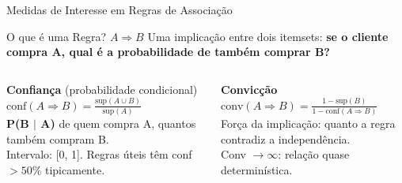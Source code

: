\documentclass[aspectratio=169]{beamer}
\begin{document}
\begin{frame}{Medidas de Interesse em Regras de Associação}
    \begin{block}{O que é uma Regra? $A \Rightarrow B$}
        \footnotesize
        Uma implicação entre dois itemsets: \textbf{se o cliente compra A, qual é a probabilidade de também comprar B?}
    \end{block}
    \pause
    \begin{columns}
        
        \begin{block}{\textbf{Confiança} (probabilidade condicional)}
            \footnotesize
            $\text{conf}(A \Rightarrow B) = \frac{\text{sup}(A \cup B)}{\text{sup}(A)}$\\[4pt]
            \textbf{P(B $|$ A)} de quem compra A, quantos também compram B.\\[4pt]
            Intervalo: [0, 1]. Regras úteis têm conf $> 50\%$ tipicamente.
        \end{block}
        
        \begin{block}{\textbf{Convicção}}
            \footnotesize
            $\text{conv}(A \Rightarrow B) = \frac{1 - \text{sup}(B)}{1 - \text{conf}(A \Rightarrow B)}$\\[4pt]
            Força da implicação: quanto a regra contradiz a independência.\\[4pt]
            Conv $\to \infty$: relação quase determinística.
        \end{block}
    \end{columns}
\end{frame}
\end{document}
